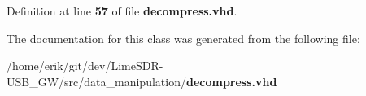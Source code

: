 Definition at line {\bf 57} of file {\bf decompress.\+vhd}.



The documentation for this class was generated from the following file\+:\begin{DoxyCompactItemize}
\item 
/home/erik/git/dev/\+Lime\+S\+D\+R-\/\+U\+S\+B\+\_\+\+G\+W/src/data\+\_\+manipulation/{\bf decompress.\+vhd}\end{DoxyCompactItemize}

